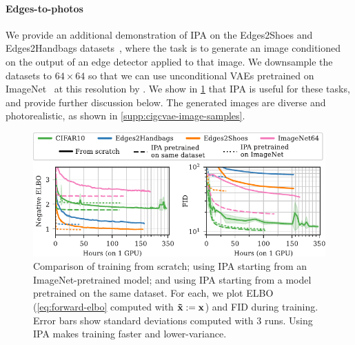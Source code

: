 \paragraph{Edges-to-photos}
We provide an additional demonstration of IPA on the Edges2Shoes and
Edges2Handbags datasets~\citep{isola2016image}, where the task is to generate an
image conditioned on the output of an edge detector applied to that image. We
downsample the datasets to $64\times64$ so that we can use unconditional VAEs
pretrained on ImageNet~\citep{deng2009imagenet} at this resolution by
\citet{child2020very}. We show in \cref{fig:cigcvae-training} that IPA is useful for
these tasks, and provide further discussion below. The generated images are
diverse and photorealistic, as shown in \cref{supp:cigcvae-image-samples}.



\begin{figure}[t]
  \centering
  \includegraphics[scale=1]{figs/cigcvae/training-both}
  \caption{Comparison of training from scratch; using IPA starting from an ImageNet-pretrained model; and using IPA starting from a model pretrained on the same dataset. For each, we plot ELBO (\cref{eq:forward-elbo} computed with $\mathbf{\tilde{x}}{} := {\mathbf{x}}$) and FID during training. Error bars show standard deviations computed with 3 runs. Using IPA makes training faster and lower-variance.}
  \label{fig:cigcvae-training}
\end{figure}

